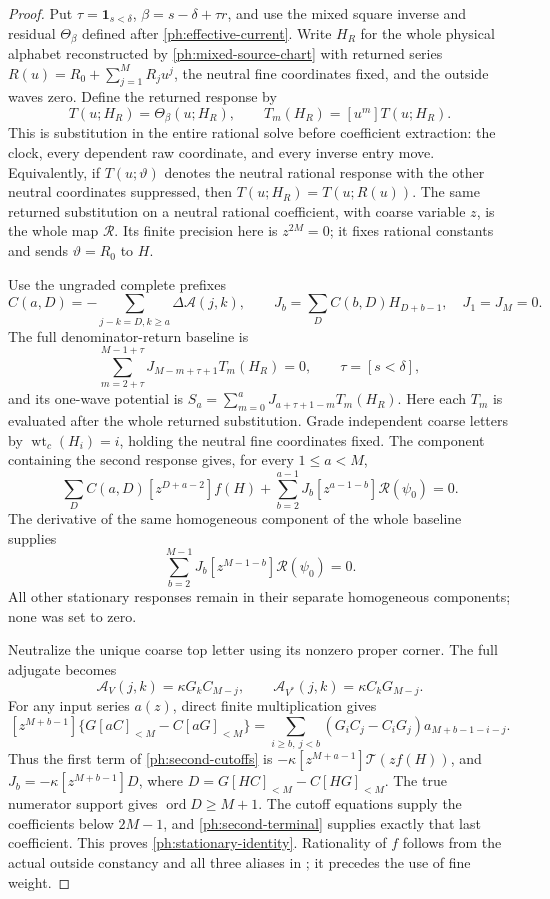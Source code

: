 \documentclass[11pt,a4paper]{amsart}
\numberwithin{equation}{section}
\theoremstyle{plain}
\theoremstyle{definition}
\newcommand{\one}{\mathbf1}
\newcommand{\ord}{\operatorname{ord}}
\begin{document}
\begin{proof}
Put \(\tau=\one_{s<\delta}\), \(\beta=s-\delta+\tau r\), and use the
mixed square inverse and residual \(\Theta_\beta\) defined after
\eqref{ph:effective-current}.  Write \(H_R\) for the whole physical
alphabet reconstructed by \eqref{ph:mixed-source-chart} with returned
series \(R(u)=R_0+\sum_{j=1}^M R_ju^j\), the neutral fine coordinates
fixed, and the outside waves zero.  Define the returned response by
\[
 T(u;H_R)=\Theta_\beta(u;H_R),\qquad
 T_m(H_R)=[u^m]T(u;H_R).
\]
This is substitution in the entire rational solve before coefficient
extraction: the clock, every dependent raw coordinate, and every
inverse entry move.  Equivalently, if \(T(u;\vartheta)\) denotes the
neutral rational response with the other neutral coordinates suppressed,
then \(T(u;H_R)=T(u;R(u))\).
The same returned substitution on a neutral rational coefficient,
with coarse variable \(z\), is the whole map \(\mathcal R\).
Its finite precision here is \(z^{2M}=0\); it fixes rational constants
and sends \(\vartheta=R_0\) to \(H\).

Use the ungraded complete prefixes
\[
 C(a,D)=-\sum_{j-k=D,k\ge a}\Delta\mathcal A(j,k),\qquad
 J_b=\sum_D C(b,D)H_{D+b-1},\quad J_1=J_M=0.
\]
The full denominator-return baseline is
\[
 \sum_{m=2+\tau}^{M-1+\tau}J_{M-m+\tau+1}T_m(H_R)=0,
 \qquad \tau=[s<\delta],
\]
and its one-wave potential is
\(S_a=\sum_{m=0}^aJ_{a+\tau+1-m}T_m(H_R)\).
Here each \(T_m\) is evaluated after the whole returned substitution.
Grade independent coarse letters by \(\operatorname{wt}_c(H_i)=i\), holding the
neutral fine coordinates fixed.  The component containing the second
response gives, for every \(1\le a<M\),
\begin{equation}\label{ph:second-cutoffs}
 \sum_D C(a,D)[z^{D+a-2}]f(H)
   +\sum_{b=2}^{a-1}J_b[z^{a-1-b}]\mathcal R(\psi_0)=0.
\end{equation}
The derivative of the same homogeneous component of the whole baseline
supplies
\begin{equation}\label{ph:second-terminal}
 \sum_{b=2}^{M-1}J_b[z^{M-1-b}]\mathcal R(\psi_0)=0.
\end{equation}
All other stationary responses remain in their separate homogeneous
components; none was set to zero.

Neutralize the unique coarse top letter using its nonzero proper corner.
The full adjugate becomes
\[
 \mathcal A_V(j,k)=\kappa G_kC_{M-j},\qquad
 \mathcal A_{V^*}(j,k)=\kappa C_kG_{M-j}.
\]
For any input series \(a(z)\), direct finite multiplication gives
\[
 [z^{M+b-1}]\{G[aC]_{<M}-C[aG]_{<M}\}
  =\sum_{i\ge b,\ j<b}(G_iC_j-C_iG_j)a_{M+b-1-i-j}.
\]
Thus the first term of \eqref{ph:second-cutoffs} is
\(-\kappa[z^{M+a-1}]\mathcal T(zf(H))\), and
\(J_b=-\kappa[z^{M+b-1}]D\), where
\(D=G[HC]_{<M}-C[HG]_{<M}\).
The true numerator support gives \(\ord D\ge M+1\).
The cutoff equations supply the coefficients below \(2M-1\), and
\eqref{ph:second-terminal} supplies exactly that last coefficient.
This proves \eqref{ph:stationary-identity}.  Rationality of \(f\) follows
from the actual outside constancy and all three aliases in
; it precedes the use of fine weight.
\end{proof}
\end{document}
